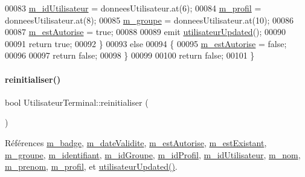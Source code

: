 \begin{DoxyCode}
00083         \hyperlink{class_utilisateur_terminal_a3a8aeb429529ae1600c799e427370f78}{m\_idUtilisateur} = donneesUtilisateur.at(6);
00084         \hyperlink{class_utilisateur_terminal_ac25eb049eaa55bc16d2f516a551eb769}{m\_profil} = donneesUtilisateur.at(8);
00085         \hyperlink{class_utilisateur_terminal_a824944eb7dc8689a0b0ecfa2fc9e4e6c}{m\_groupe} = donneesUtilisateur.at(10);
00086 
00087         \hyperlink{class_utilisateur_terminal_a79d15bdf8428eb1a131ce4801ac619aa}{m\_estAutorise} = \textcolor{keyword}{true};
00088 
00089         emit \hyperlink{class_utilisateur_terminal_ade3153552e04d348ddb5c1ebdb95450a}{utilisateurUpdated}();
00090 
00091         \textcolor{keywordflow}{return} \textcolor{keyword}{true};
00092     \}
00093     \textcolor{keywordflow}{else}
00094     \{
00095         \hyperlink{class_utilisateur_terminal_a79d15bdf8428eb1a131ce4801ac619aa}{m\_estAutorise} = \textcolor{keyword}{false};
00096 
00097         \textcolor{keywordflow}{return} \textcolor{keyword}{false};
00098     \}
00099 
00100     \textcolor{keywordflow}{return} \textcolor{keyword}{false};
00101 \}
\end{DoxyCode}
\mbox{\label{class_utilisateur_terminal_a63b37fa7cbf08976e5a09cbfbdb55f42}} 
\paragraph{\texorpdfstring{reinitialiser()}{reinitialiser()}}
{\footnotesize\ttfamily bool Utilisateur\+Terminal\+::reinitialiser (\begin{DoxyParamCaption}{ }\end{DoxyParamCaption})}



Références \hyperlink{class_utilisateur_terminal_a06e0603919eb3846cf5bd232c105d1a7}{m\+\_\+badge}, \hyperlink{class_utilisateur_terminal_a7af3e6861711071624b93544adf3ca48}{m\+\_\+date\+Validite}, \hyperlink{class_utilisateur_terminal_a79d15bdf8428eb1a131ce4801ac619aa}{m\+\_\+est\+Autorise}, \hyperlink{class_utilisateur_terminal_a6b16983fcb2b0f1f698f595309a67828}{m\+\_\+est\+Existant}, \hyperlink{class_utilisateur_terminal_a824944eb7dc8689a0b0ecfa2fc9e4e6c}{m\+\_\+groupe}, \hyperlink{class_utilisateur_terminal_a4dd1abd0c87ed9bf99ab3343e17cef43}{m\+\_\+identifiant}, \hyperlink{class_utilisateur_terminal_a669ece5480e25b47711c430d020581c2}{m\+\_\+id\+Groupe}, \hyperlink{class_utilisateur_terminal_af3d06352ecbd2d4439626b4ba53b55be}{m\+\_\+id\+Profil}, \hyperlink{class_utilisateur_terminal_a3a8aeb429529ae1600c799e427370f78}{m\+\_\+id\+Utilisateur}, \hyperlink{class_utilisateur_terminal_a4b48835dcadacd5e7d5c9662b70cdc7d}{m\+\_\+nom}, \hyperlink{class_utilisateur_terminal_a6dc3be09e844fc14aafec8019a1e2a5e}{m\+\_\+prenom}, \hyperlink{class_utilisateur_terminal_ac25eb049eaa55bc16d2f516a551eb769}{m\+\_\+profil}, et \hyperlink{class_utilisateur_terminal_ade3153552e04d348ddb5c1ebdb95450a}{utilisateur\+Updated()}.


